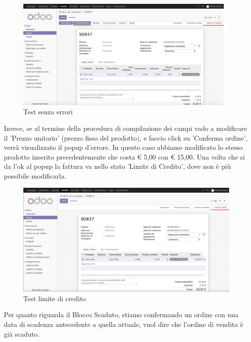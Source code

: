 \begin{figure}[H]
	\begin{center} \includegraphics[scale=0.3]{figures/first_test}
		\caption[Test senza errori]{Test senza errori}
		\label{fig:first_test}
	\end{center}
\end{figure}

Invece, se al termine della procedura di compilazione dei campi vado a modificare il 'Prezzo unitario' (prezzo fisso del prodotto), e faccio click su 'Conferma ordine', verrà visualizzato il popup d'errore.
In questo caso abbiamo modificato lo stesso prodotto inserito precedentemente che costa € 5,00 con € 15,00. 
Una volta che si da l'ok al popup la fattura va nello stato 'Limite di Credito', dove non è più possibile modificarla.


\begin{figure}[H]
	\begin{center} \includegraphics[scale=0.3]{figures/second_test}
		\caption[Test limite di credito]{Test limite di credito}
		\label{fig:second_test}
	\end{center}
\end{figure}

Per quanto riguarda il Blocco Scaduto, stiamo confermando un ordine con una data di scadenza antecedente a quella attuale, vuol dire che l'ordine di vendita è già scaduto.

